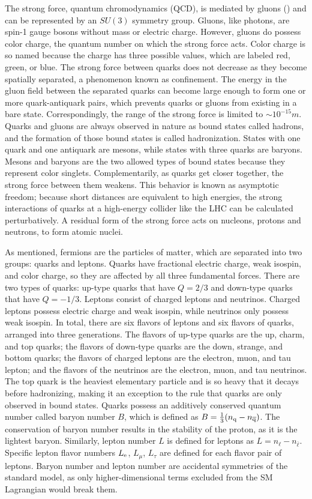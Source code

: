 The strong force, quantum chromodynamics (QCD), is mediated by gluons (\cPg) and can be represented by an $SU(3)$ symmetry group. Gluons, like photons, are spin-1 gauge bosons without mass or electric charge. However, gluons do possess color charge, the quantum number on which the strong force acts. Color charge is so named because the charge has three possible values, which are labeled red, green, or blue. The strong force between quarks does not decrease as they become spatially separated, a phenomenon known as confinement. The energy in the gluon field between the separated quarks can become large enough to form one or more quark-antiquark pairs, which prevents quarks or gluons from existing in a bare state. Correspondingly, the range of the strong force is limited to ${\sim} 10^{-15}\unit{m}$. Quarks and gluons are always observed in nature as bound states called hadrons, and the formation of those bound states is called hadronization. States with one quark and one antiquark are mesons, while states with three quarks are baryons. Mesons and baryons are the two allowed types of bound states because they represent color singlets. Complementarily, as quarks get closer together, the strong force between them weakens. This behavior is known as asymptotic freedom; because short distances are equivalent to high energies, the strong interactions of quarks at a high-energy collider like the LHC can be calculated perturbatively. A residual form of the strong force acts on nucleons, protons and neutrons, to form atomic nuclei.

As mentioned, fermions are the particles of matter, which are separated into two groups: quarks and leptons. Quarks have fractional electric charge, weak isospin, and color charge, so they are affected by all three fundamental forces. There are two types of quarks: up-type quarks that have $Q = 2/3$ and down-type quarks that have $Q = -1/3$. Leptons consist of charged leptons and neutrinos. Charged leptons possess electric charge and weak isospin, while neutrinos only possess weak isospin. In total, there are six flavors of leptons and six flavors of quarks, arranged into three generations. The flavors of up-type quarks are the up, charm, and top quarks; the flavors of down-type quarks are the down, strange, and bottom quarks; the flavors of charged leptons are the electron, muon, and tau lepton; and the flavors of the neutrinos are the electron, muon, and tau neutrinos. The top quark is the heaviest elementary particle and is so heavy that it decays before hadronizing, making it an exception to the rule that quarks are only observed in bound states. Quarks possess an additively conserved quantum number called baryon number $B$, which is defined as $B = \frac{1}{3}(n_{\mathrm{q}} - n_{\overline{\mathrm{q}}})$. The conservation of baryon number results in the stability of the proton, as it is the lightest baryon. Similarly, lepton number $L$ is defined for leptons as $L = n_{\ell} - n_{\overline{\ell}}$. Specific lepton flavor numbers $L_{\mathrm{e}}$, $L_{\mu}$, $L_{\tau}$ are defined for each flavor pair of leptons. Baryon number and lepton number are accidental symmetries of the standard model, as only higher-dimensional terms excluded from the SM Lagrangian would break them. 

